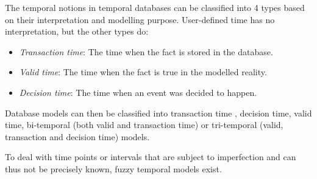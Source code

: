 The temporal notions in temporal databases can be classified into 4 types based on their interpretation and modelling purpose. User-defined time has no interpretation, but the other types do:

\begin{itemize}
	\item
	\emph{Transaction time}: The time when the fact is stored in the database.
	\item
	\emph{Valid time}: The time when the fact is true in the modelled reality.
	\item
	\emph{Decision time}: The time when an event was decided to happen. 
\end{itemize}
	
Database models can then be classified into transaction time \cite{Jensen91}, decision time, valid time, bi-temporal \cite{Snodgrass84}(both valid and transaction time) or tri-temporal \cite{Nascimento95} (valid, transaction and decision time) models.


To deal with time points \cite{Dubois89} or intervals \cite{Garrido2009} that are subject to imperfection and can thus not be precisely known, fuzzy temporal models \cite{schockaert08} exist. %
